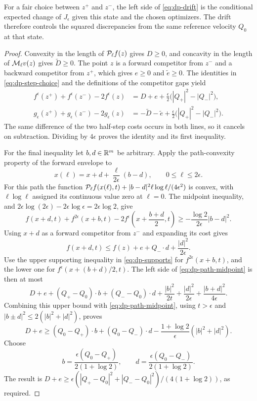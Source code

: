 For a fair choice between $z^+$ and $z^-$, the left side of
\eqref{eq:dp-drift} is the conditional expected change of $J_\epsilon$
given this state and the chosen optimizers.
The drift therefore controls the squared discrepancies from the same
reference velocity $Q_0$ at that state.

\begin{proof}
Convexity in the length of $\mathcal{P}_\ell f(z)$ gives $D\ge0$, and concavity
in the length of $\mathcal{M}_\ell v(z)$ gives $\widetilde D\ge0$.  The point $z$
is a forward competitor from $z^-$ and a backward competitor from $z^+$,
which gives $e\ge0$ and $\widetilde e\ge0$.  The identities in
\eqref{eq:dp-step-choice} and the definitions of the competitor gaps yield
\begin{align*}
  f^\epsilon(z^+)+f^\epsilon(z^-)-2f^\epsilon(z)
    &=D+e+\frac{\epsilon}{2}\bigl(|Q_+|^2-|Q_-|^2\bigr),\\
  g_\epsilon(z^+)+g_\epsilon(z^-)-2g_\epsilon(z)
    &=-\widetilde D-\widetilde e
       +\frac{\epsilon}{2}\bigl(|Q_+|^2-|Q_-|^2\bigr).
\end{align*}
The same difference of the two half-step costs occurs in both lines, so it
cancels on subtraction.  Dividing by $4\epsilon$ proves the identity and
its first inequality.

For the final inequality let $b,d\in\mathbb{R}^m$ be arbitrary.  Apply the
path-convexity property of the forward envelope to
\[
  x(\ell)=x+d+\frac{\ell}{2\epsilon}(b-d),\qquad 0\le\ell\le2\epsilon.
\]
For this path the function
$\mathcal{P}_\ell f(x(\ell),t)+|b-d|^2\ell\log\ell/(4\epsilon^2)$ is convex,
with $\ell\log\ell$ assigned its continuous value zero at $\ell=0$.
The midpoint inequality, and
$2\epsilon\log(2\epsilon)-2\epsilon\log\epsilon=2\epsilon\log2$, give
\begin{equation}\label{eq:dp-path-midpoint}
  f(x+d,t)+f^{2\epsilon}(x+b,t)
    -2f^\epsilon\left(x+\frac{b+d}{2},t\right)
  \ge-\frac{\log2}{2\epsilon}|b-d|^2.
\end{equation}
Using $x+d$ as a forward competitor from $z^-$ and expanding its cost gives
\[
  f(x+d,t)\le f(z)+e+Q_-\cdot d+\frac{|d|^2}{2\epsilon}.
\]
Use the upper supporting inequality in \eqref{eq:dp-supports} for
$f^{2\epsilon}(x+b,t)$, and the lower one for
$f^\epsilon(x+(b+d)/2,t)$.  The left side of
\eqref{eq:dp-path-midpoint} is then at most
\[
  D+e+(Q_+-Q_0)\cdot b+(Q_--Q_0)\cdot d
       +\frac{|b|^2}{2t}+\frac{|d|^2}{2\epsilon}
       +\frac{|b+d|^2}{4\epsilon}.
\]
Combining this upper bound with \eqref{eq:dp-path-midpoint}, using
$t>\epsilon$ and $|b\pm d|^2\le2(|b|^2+|d|^2)$, proves
\[
  D+e\ge (Q_0-Q_+)\cdot b+(Q_0-Q_-)\cdot d
            -\frac{1+\log2}{\epsilon}(|b|^2+|d|^2).
\]
Choose
\[
  b=\frac{\epsilon(Q_0-Q_+)}{2(1+\log2)},\qquad
  d=\frac{\epsilon(Q_0-Q_-)}{2(1+\log2)}.
\]
The result is
$D+e\ge\epsilon(|Q_+-Q_0|^2+|Q_--Q_0|^2)/(4(1+\log2))$, as required.
\end{proof}

